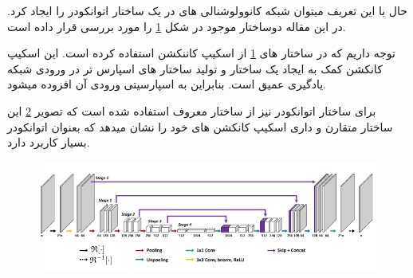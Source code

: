 حال با این تعریف میتوان شبکه کانوولوشنالی های در یک ساختار اتوانکودر را ایجاد کرد.
در این مقاله دوساختار موجود در شکل 	\ref{fig:kspace2020-architectures}
را مورد بررسی قرار داده است.

\begin{figure}
	\centering
	\label{fig:kspace2020-architectures}
\end{figure}

توجه داریم که در ساختار های \ref{fig:kspace2020-architectures}
از اسکیپ کاننکشن 
استفاده کرده است. این اسکیپ کانکشن کمک به ایجاد یک ساختار  و تولید ساختار های اسپارس تر در ورودی شبکه یادگیری عمیق است. بنابراین به اسپارسیتی ورودی آن افزوده میشود.

برای ساختار اتوانکودر نیز از ساختار معروف  استفاده شده است که تصویر 
\ref{fig:unet}
این ساختار متقارن و داری اسکیپ کانکشن های خود را نشان میدهد که بعنوان اتوانکودر بسیار کاربرد دارد.



\begin{figure}
	\centering
	\includegraphics[width=0.9\linewidth]{chapters/chapter-3/figs/unet}
	\caption{}
	\label{fig:unet}
\end{figure}









